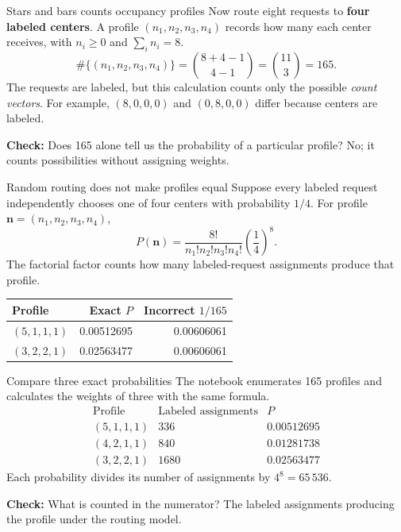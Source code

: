 \documentclass[aspectratio=169,10pt,english]{beamer}
\begin{document}
\begin{frame}{Stars and bars counts occupancy profiles}
\small
Now route eight requests to \textbf{four labeled centers}. A profile $(n_1,n_2,n_3,n_4)$ records how many each center receives, with $n_i\geq0$ and $\sum_i n_i=8$.
\[
\#\{(n_1,n_2,n_3,n_4)\}=\binom{8+4-1}{4-1}=\binom{11}{3}=165.
\]
The requests are labeled, but this calculation counts only the possible \emph{count vectors}. For example, $(8,0,0,0)$ and $(0,8,0,0)$ differ because centers are labeled.
\par\medskip
\textbf{Check:} Does 165 alone tell us the probability of a particular profile? No; it counts possibilities without assigning weights.
\end{frame}

\begin{frame}{Random routing does not make profiles equal}
\small
Suppose every labeled request independently chooses one of four centers with probability $1/4$. For profile $\boldsymbol n=(n_1,n_2,n_3,n_4)$,
\[
P(\boldsymbol n)=\frac{8!}{n_1!n_2!n_3!n_4!}\left(\frac14\right)^8.
\]
The factorial factor counts how many labeled-request assignments produce that profile.
\begin{center}
\begin{tabular}{lrr}
\toprule Profile & Exact $P$ & Incorrect $1/165$ \\ \midrule
$(5,1,1,1)$ & 0.00512695 & 0.00606061\\
$(3,2,2,1)$ & 0.02563477 & 0.00606061\\ \bottomrule
\end{tabular}
\end{center}
\end{frame}

\begin{frame}{Compare three exact probabilities}
\small
The notebook enumerates 165 profiles and calculates the weights of three with the same formula.
\[
\begin{array}{c|c|c}
\text{Profile}&\text{Labeled assignments}&P\\\hline
(5,1,1,1)&336&0.00512695\\
(4,2,1,1)&840&0.01281738\\
(3,2,2,1)&1680&0.02563477
\end{array}
\]
Each probability divides its number of assignments by $4^8=65\,536$.
\par\medskip
\textbf{Check:} What is counted in the numerator? The labeled assignments producing the profile under the routing model.
\end{frame}
\end{document}
